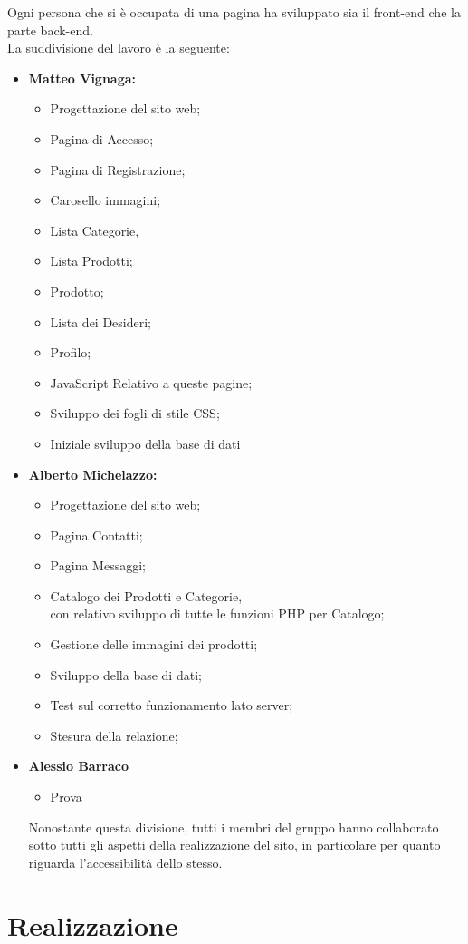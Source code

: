 \documentclass[a4paper, 11pt]{article}
\begin{document}
Ogni persona che si è occupata di una pagina ha sviluppato sia il front-end che la parte back-end. \\
La suddivisione del lavoro è la seguente:

\begin{itemize}
\item \textbf{Matteo Vignaga:}
	\begin{itemize}
		\item Progettazione del sito web;
		\item Pagina di Accesso;
		\item Pagina di Registrazione;
		\item Carosello immagini;
		\item Lista Categorie,
		\item Lista Prodotti;
		\item Prodotto;
		\item Lista dei Desideri;
		\item Profilo;
		\item JavaScript Relativo a queste pagine;
		\item Sviluppo dei fogli di stile CSS;
		\item Iniziale sviluppo della base di dati
	\end{itemize}

\item \textbf{Alberto Michelazzo:}
	\begin{itemize}
		\item Progettazione del sito web;
		\item Pagina Contatti;
		\item Pagina Messaggi;
		\item Catalogo dei Prodotti e Categorie, \\ 
		con relativo sviluppo di tutte le funzioni PHP per Catalogo;
	  	\item Gestione delle immagini dei prodotti;
		\item Sviluppo della base di dati;
		\item Test sul corretto funzionamento lato server;
		\item Stesura della relazione;
	\end{itemize}

\item \textbf{Alessio Barraco}
	\begin{itemize}
	\item Prova
	\end{itemize}
	
Nonostante questa divisione, tutti i membri del gruppo hanno collaborato sotto tutti gli aspetti della realizzazione del sito, in particolare per quanto riguarda l'accessibilità dello stesso.
\end{itemize}

\section{Realizzazione}
\end{document}
